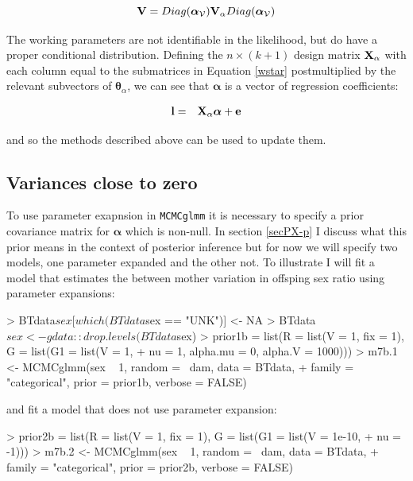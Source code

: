 \documentclass{article}
\begin{document}
\begin{equation} 
{\bf V} = Diag({\bm \alpha}_{\mathcal{V}}){\bf V}_{\alpha}Diag({\bm \alpha}_{\mathcal{V}})
\end{equation} 


The working parameters are not identifiable in the likelihood, but do have a proper conditional distribution. Defining the $n\times(k+1)$ design matrix ${\bf X}_{\alpha}$ with each column equal to the submatrices in Equation \ref{wstar} postmultiplied by the relevant subvectors of ${\bm \theta}_{\alpha}$, we can see that ${\bm \alpha}$ is a vector of regression coefficients: 

\begin{equation}
\begin{array}{rl}
\bf{l} =& {\bf X}_{\alpha}{\bm \alpha}+\bf{e}\\
\end{array}
\end{equation}

and so the methods described above can be used to update them. 

\subsection{Variances close to zero}

To use parameter exapnsion in \texttt{MCMCglmm} it is necessary to specify a prior covariance matrix for ${\bm \alpha}$ which is non-null. In section \ref{secPX-p} I discuss what this prior means in the context of posterior inference but for now we will specify two models, one parameter expanded and the other not. To illustrate I will fit a model that estimates the between mother variation in offsping sex ratio using parameter expansions:

\begin{Schunk}
\begin{Sinput}
> BTdata$sex[which(BTdata$sex == "UNK")] <- NA
> BTdata$sex <- gdata::drop.levels(BTdata$sex)
> prior1b = list(R = list(V = 1, fix = 1), G = list(G1 = list(V = 1, 
+     nu = 1, alpha.mu = 0, alpha.V = 1000)))
> m7b.1 <- MCMCglmm(sex ~ 1, random = ~dam, data = BTdata, 
+     family = "categorical", prior = prior1b, verbose = FALSE)
\end{Sinput}
\end{Schunk}

and fit a model that does not use parameter expansion:

\begin{Schunk}
\begin{Sinput}
> prior2b = list(R = list(V = 1, fix = 1), G = list(G1 = list(V = 1e-10, 
+     nu = -1)))
> m7b.2 <- MCMCglmm(sex ~ 1, random = ~dam, data = BTdata, 
+     family = "categorical", prior = prior2b, verbose = FALSE)
\end{Sinput}
\end{Schunk}
\end{document}
